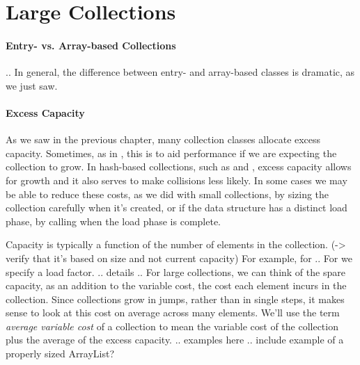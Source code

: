 





\section{Large Collections}

\paragraph{Entry- vs. Array-based Collections}

.. In general, the difference between entry- and
array-based classes is dramatic, as we just saw.  

\paragraph{Excess Capacity}

As we saw in the previous chapter, many collection classes allocate excess
capacity. Sometimes, as in , this is to aid performance
if we are expecting the collection to grow. In hash-based collections, 
such as  and , excess capacity allows for
growth and it also serves to make collisions less likely. In some cases we may
be able to reduce these costs, as we did with
small collections, by sizing the collection carefully when it's created, or if
the data structure has a distinct load phase, by calling  when
the load phase is complete.

Capacity is typically a function of the number of
elements in the collection. (-> verify that it's based on size and not current
capacity) For example, for  ..   For  we specify a load factor. .. details .. 
For large collections, we can think of the spare capacity, as an addition to
the variable cost, the cost each element incurs in the collection. Since
collections grow in jumps, rather than in single steps, it makes sense to look
at this cost on average across many elements. We'll use the term \emph{average
variable cost} of a collection to mean the variable cost of the collection 
plus the average of the excess capacity.  .. examples here ..  include example
of a properly sized ArrayList?

